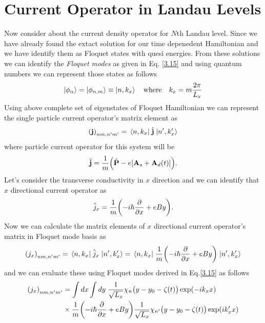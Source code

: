 \section{Current Operator in Landau Levels}

Now consider about the current density operator for $N$th Landau level. Since we have already found the extact solution for our time depenedent Hamiltonian and we have identify them as Floquet states with quesi energies. From these solutions we can identify the \textit{Floquet modes} as given in Eq. \eqref{3.15} and using quantum numbers we can represent those states as follows
\begin{equation} \label{6.1}
  \ket{\phi_{\alpha}} = \ket{\phi_{n,m}} \equiv \ket{n,k_x} \quad
  \text{where} \quad
  k_x = m \frac{2\pi}{L_x}
\end{equation}
Using above complete set of eigenstates of Floquet Hamiltonian we can represent the single particle current operator's matrix element as
\begin{equation} \label{6.2}
  \qty(\mathbf{j})_{nm,n'm'} = \mel{n,k_x}{\;\hat{\mathbf{j}}\;}{n',k'_x}
\end{equation}
where particle current operator for this system will be
\begin{equation} \label{6.3}
  \hat{\mathbf{j}} = \frac{1}{m} \qty(\hat{\mathbf{P}} - e\qty[\mathbf{A}_s + \mathbf{A}_d(t)]).
\end{equation}
Let's consider the transverse conductivity in $x$ direction and we can identify that $x$ directional current operator as
\begin{equation} \label{6.4}
  \hat{j}_x = \frac{1}{m} \qty(-i\hbar\pdv{x} + eBy).
\end{equation}
Now we can calculate the matrix elements of $x$ directional current operator's matrix in Floquet mode basis as
\begin{equation} \label{6.5}
  \qty({j}_x)_{nm,n'm'} = \mel{n,k_x}{\;\hat{j}_x\;}{n',k'_x} =
  \mel{n,k_x}{\;\frac{1}{m} \qty(-i\hbar\pdv{x} + eBy)\;}{n',k'_x}
\end{equation}
and we can evaluate these using Floquet modes derived in Eq.\eqref{3.15} as follows
\begin{equation} \label{6.6}
  \begin{aligned}
    \qty({j}_x)_{nm,n'm'} & =
    \int dx \int dy \;
    \frac{1}{\sqrt{L_x}} \chi_{n}\big(y - y_0 - \zeta(t)\big)
    \exp(-ik_x x) \\
    & \times
    \frac{1}{m} \qty(-i\hbar\pdv{x} + eBy)
    \frac{1}{\sqrt{L_x}} \chi_{n'}\big(y - y_0 - \zeta(t)\big)
    \exp(i k'_x x)
  \end{aligned}
\end{equation}
